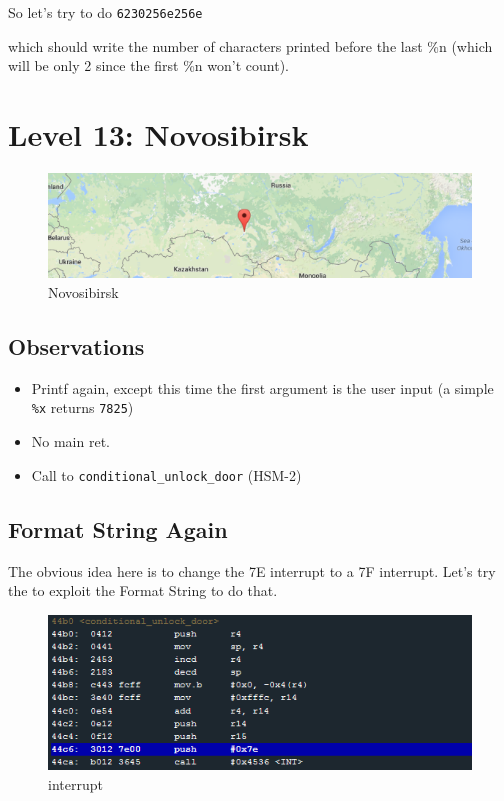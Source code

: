 \documentclass[a4paper,11pt]{article}
\begin{document}
So let's try to do \texttt{6230256e256e}

which should write the number of characters printed before the last \%n
(which will be only 2 since the first \%n won't count).

\section{Level 13: Novosibirsk}\label{level-13-novosibirsk}

\begin{figure}[htbp]
\centering
\includegraphics{img/13_1.PNG}
\caption{Novosibirsk}
\end{figure}

\subsection{Observations}\label{observations}

\begin{itemize}
\itemsep1pt\parskip0pt
\item
  Printf again, except this time the first argument is the user input (a
  simple \texttt{\%x} returns \texttt{7825})
\item
  No main ret.
\item
  Call to \texttt{conditional\_unlock\_door} (HSM-2)
\end{itemize}

\subsection{Format String Again}\label{format-string-again}

The obvious idea here is to change the 7E interrupt to a 7F interrupt.
Let's try the to exploit the Format String to do that.

\begin{figure}[htbp]
\centering
\includegraphics{img/13_2.PNG}
\caption{interrupt}
\end{figure}
\end{document}
